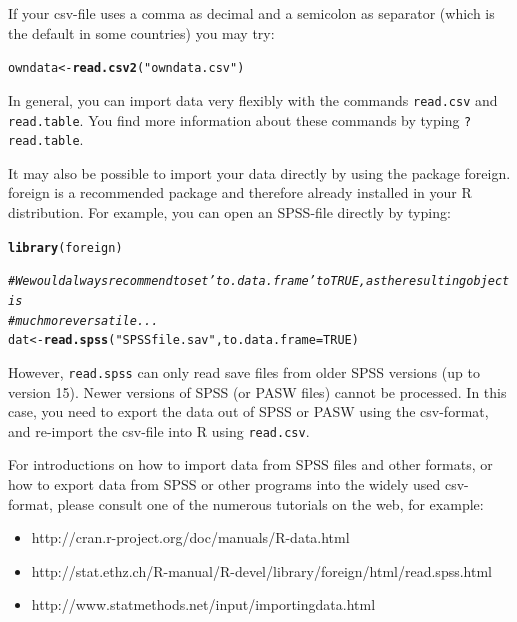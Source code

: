 \documentclass[a4paper]{article}\usepackage[]{graphicx}\usepackage[]{color}
\makeatletter
\newcommand{\hlnum}[1]{\textcolor[rgb]{0.686,0.059,0.569}{#1}}%
\newcommand{\hlstr}[1]{\textcolor[rgb]{0.192,0.494,0.8}{#1}}%
\newcommand{\hlcom}[1]{\textcolor[rgb]{0.678,0.584,0.686}{\textit{#1}}}%
\newcommand{\hlstd}[1]{\textcolor[rgb]{0.345,0.345,0.345}{#1}}%
\newcommand{\hlkwb}[1]{\textcolor[rgb]{0.69,0.353,0.396}{#1}}%
\newcommand{\hlkwc}[1]{\textcolor[rgb]{0.333,0.667,0.333}{#1}}%
\newcommand{\hlkwd}[1]{\textcolor[rgb]{0.737,0.353,0.396}{\textbf{#1}}}%
\newenvironment{kframe}{%
 \def\at@end@of@kframe{}%
 \ifinner\ifhmode%
  \def\at@end@of@kframe{\end{minipage}}%
  \begin{minipage}{\columnwidth}%
 \fi\fi%
 \def\FrameCommand##1{\hskip\@totalleftmargin \hskip-\fboxsep
 \colorbox{shadecolor}{##1}\hskip-\fboxsep
     \hskip-\linewidth \hskip-\@totalleftmargin \hskip\columnwidth}%
 \MakeFramed {\advance\hsize-\width
   \@totalleftmargin\z@ \linewidth\hsize
   \@setminipage}}%
 {\par\unskip\endMakeFramed%
 \at@end@of@kframe}
\newenvironment{knitrout}{}{} %
\makeatother
\begin{document}
If your csv-file uses a comma as decimal and a semicolon as separator (which is the default in some countries) you may try:
\begin{knitrout}\small
{}\color{fgcolor}\begin{kframe}
\begin{alltt}
\hlstd{owndata} \hlkwb{<-} \hlkwd{read.csv2}\hlstd{(}\hlstr{"owndata.csv"}\hlstd{)}
\end{alltt}
\end{kframe}
\end{knitrout}

In general, you can import data very flexibly with the commands \texttt{read.csv} and \texttt{read.table}. You find more information about these commands by typing \texttt{?read.table}.  
  
It may also be possible to import your data directly by using the package foreign. foreign is a recommended package and therefore already installed in your R distribution. For example, you can open an SPSS-file directly by typing:

\begin{knitrout}\small
{}\color{fgcolor}\begin{kframe}
\begin{alltt}
\hlkwd{library}\hlstd{(foreign)}

\hlcom{# We would always recommend to set 'to.data.frame' to TRUE, as the resulting object is}
\hlcom{# much more versatile ...}
\hlstd{dat} \hlkwb{<-} \hlkwd{read.spss}\hlstd{(}\hlstr{"SPSSfile.sav"}\hlstd{,} \hlkwc{to.data.frame} \hlstd{=} \hlnum{TRUE}\hlstd{)}
\end{alltt}
\end{kframe}
\end{knitrout}

However, \texttt{read.spss} can only read save files from older SPSS versions (up to version 15). Newer versions of SPSS (or PASW files) cannot be processed. In this case, you need to export the data out of SPSS or PASW using the csv-format, and re-import the csv-file into R using \texttt{read.csv}.

For introductions on how to import data from SPSS files and other formats, or how to export data from SPSS or other programs into the widely used csv-format, please consult one of the numerous tutorials on the web, for example:
\begin{itemize}
	\item http://cran.r-project.org/doc/manuals/R-data.html
	\item http://stat.ethz.ch/R-manual/R-devel/library/foreign/html/read.spss.html
	\item http://www.statmethods.net/input/importingdata.html
\end{itemize}
\end{document}
